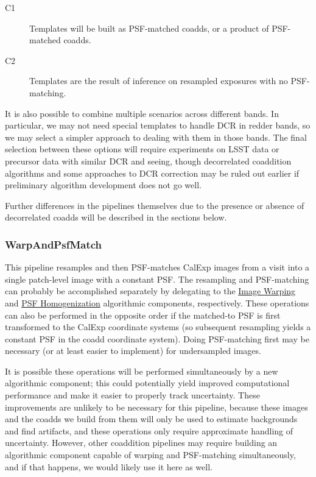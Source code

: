 \begin{description}
  \begin{description}
    \item[C1] Templates will be built as PSF-matched coadds, or a product of PSF-matched coadds.
    \item[C2] Templates are the result of inference on resampled exposures with no PSF-matching.
  \end{description}
\end{description}
It is also possible to combine multiple scenarios across different bands.  In particular, we may not need special templates to handle DCR in redder bands, so we may select a simpler approach to dealing with them in those bands.  The final selection between these options will require experiments on LSST data or precursor data with similar DCR and seeing, though decorrelated coaddition algorithms and some approaches to DCR correction may be ruled out earlier if preliminary algorithm development does not go well.

Further differences in the pipelines themselves due to the presence or absence of decorrelated coadds will be described in the sections below.

\subsubsection{WarpAndPsfMatch}
\label{sec:drpWarpAndPsfMatch}

This pipeline resamples and then PSF-matches CalExp images from a visit into a single patch-level image with a constant PSF.  The resampling and PSF-matching can probably be accomplished separately by delegating to the \hyperref[sec:acWarping]{Image Warping} and \hyperref[sec:acPSFHomogenization]{PSF Homogenization} algorithmic components, respectively.  These operations can also be performed in the opposite order if the matched-to PSF is first transformed to the CalExp coordinate systems (so subsequent resampling yields a constant PSF in the coadd coordinate system).  Doing PSF-matching first may be necessary (or at least easier to implement) for undersampled images.

It is possible these operations will be performed simultaneously by a new algorithmic component; this could potentially yield improved computational performance and make it easier to properly track uncertainty.  These improvements are unlikely to be necessary for this pipeline, because these images and the coadds we build from them will only be used to estimate backgrounds and find artifacts, and these operations only require approximate handling of uncertainty.  However, other coaddition pipelines may require building an algorithmic component capable of warping and PSF-matching simultaneously, and if that happens, we would likely use it here as well.

